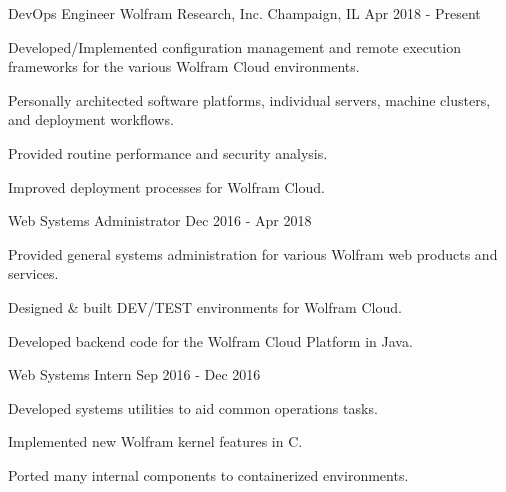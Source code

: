 

\begin{cventries}

  \cventry
    {DevOps Engineer} %
    {Wolfram Research, Inc.} %
    {Champaign, IL} %
    {Apr 2018 - Present} %
    {
      \begin{cvitems} %
        \item {Developed/Implemented configuration management and remote execution frameworks for the various Wolfram Cloud environments.}
        \item {Personally architected software platforms, individual servers, machine clusters, and deployment workflows.}
        \item {Provided routine performance and security analysis.}
        \item {Improved deployment processes for Wolfram Cloud.}
      \end{cvitems}
    }

  \cventry
    {Web Systems Administrator} %
    {} %
    {} %
    {Dec 2016 - Apr 2018} %
    {
      \begin{cvitems} %
        \item {Provided general systems administration for various Wolfram web products and services.}
        \item {Designed \& built DEV/TEST environments for Wolfram Cloud.}
        \item {Developed backend code for the Wolfram Cloud Platform in Java.}
      \end{cvitems}
    }

  \cventry
    {Web Systems Intern} %
    {} %
    {} %
    {Sep 2016 - Dec 2016} %
    {
      \begin{cvitems} %
        \item {Developed systems utilities to aid common operations tasks.}
        \item {Implemented new Wolfram kernel features in C.}
        \item {Ported many internal components to containerized environments.}
      \end{cvitems}
    }


\end{cventries}
